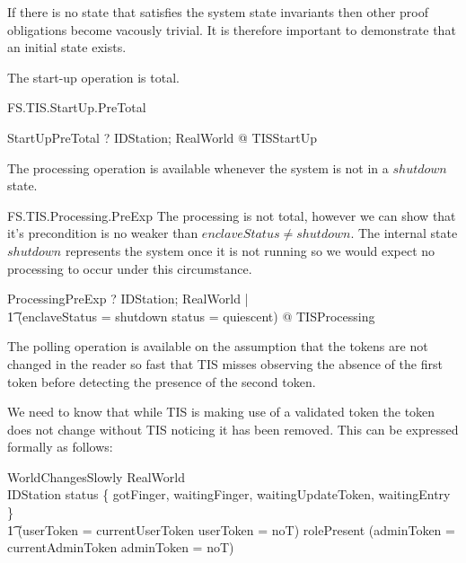 If there is no state that satisfies the system state invariants then
other proof obligations become vacously trivial. It is therefore
important to demonstrate that an initial state exists.

The start-up operation is total.

\begin{Zpobtrace}{FS.TIS.StartUp.PreTotal}
\begin{theorem}{StartUpPreTotal} \vdash? 
  \forall IDStation; RealWorld @ \pre TISStartUp
\end{theorem}
\end{Zpobtrace}



The processing operation is available whenever the system is not in a
$shutdown$ state.

\begin{Zpobtrace}{FS.TIS.Processing.PreExp}
The processing is not total, however we can show that it's precondition
is no weaker than $enclaveStatus \neq shutdown$. The internal state
$shutdown$ represents the system once it is not running so we would
expect no processing to occur under this circumstance. 

\begin{theorem}{ProcessingPreExp} \vdash? 
\forall
        IDStation; RealWorld | 
\\ \t1 \lnot (enclaveStatus = shutdown \land status = quiescent) @ \pre TISProcessing
\end{theorem}
\end{Zpobtrace}

The polling operation is available on the assumption that the tokens
are not changed in the reader so fast that TIS misses observing the
absence of the first token before detecting the presence of the 
second token.
\label{sec:PollPre}

We need to know that while TIS is making use of a validated token the
token does not change without TIS noticing it has been removed. This
can be expressed formally as follows:

\begin{schema}{WorldChangesSlowly}
RealWorld
\\ IDStation
\where
status \in \{ gotFinger, waitingFinger, waitingUpdateToken,
waitingEntry \} \implies
\\ \t1
(userToken = 
currentUserToken 
\lor userToken = noT)
\also
rolePresent \neq \Nil \implies
(adminToken = 
currentAdminToken 
\lor adminToken = noT)
\end{schema}

